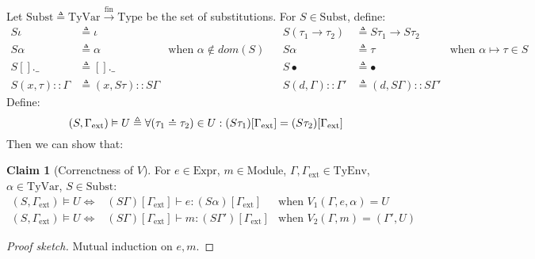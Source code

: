 \documentclass{article}
\theoremstyle{definition}
\newtheorem{clm}{Claim}[section]
\newcommand*{\cons}{::}
\newcommand*{\A}[1]{\overset{\,_{\mbox{\Large .}}}{#1}}
\newcommand*{\Expr}{\text{Expr}}
\newcommand*{\Module}{\text{Module}}
\newcommand*{\modid}{d}
\newcommand*{\fin}[2]{{#1}\xrightarrow{\text{fin}}{#2}}
\newcommand*{\TyEnv}{\text{TyEnv}}
\newcommand*{\TyVar}{\text{TyVar}}
\newcommand*{\Type}{\text{Type}}
\newcommand*{\Subst}{\text{Subst}}
\newcommand*{\external}{\Gamma_{\text{ext}}}
\begin{document}
Let $\Subst\triangleq\fin{\TyVar}{\Type}$ be the set of substitutions.
For $S\in\Subst$, define:
\begin{align*}
	S\iota               & \triangleq\iota                  &                                  &  & S(\tau_1\rightarrow\tau_2)   & \triangleq S\tau_1\rightarrow S\tau_2                                         \\
	S\alpha              & \triangleq\alpha                 & \text{when }\alpha\not\in dom(S) &  & S\alpha                      & \triangleq \tau                          & \text{when }\alpha\mapsto\tau\in S \\
	S[].\_               & \triangleq [].\_                 &                                  &  & S\bullet                     & \triangleq\bullet                                                             \\
	S(x,\tau)\cons\Gamma & \triangleq(x,S\tau)\cons S\Gamma &                                  &  & S(\modid,\Gamma)\cons\Gamma' & \triangleq(\modid,S\Gamma)\cons S\Gamma'
\end{align*}
Define:
\[(S,\external)\vDash U\triangleq\forall(\tau_1\A{=}\tau_2)\in U:(S\tau_1)[\external]= (S\tau_2)[\external]\]
Then we can show that:
\begin{clm}[Correnctness of $V$]
	For $e\in\Expr$, $m\in\Module$, $\Gamma,\external\in\TyEnv$, $\alpha\in\TyVar$, $S\in\Subst$:
	\begin{align*}
		(S,\external)\vDash U \Leftrightarrow & (S\Gamma)[\external]\vdash e:(S\alpha)[\external]  & \text{when }V_1(\Gamma,e,\alpha)=U    \\
		(S,\external)\vDash U \Leftrightarrow & (S\Gamma)[\external]\vdash m:(S\Gamma')[\external] & \text{when }V_2(\Gamma,m)=(\Gamma',U)
	\end{align*}
\end{clm}
\begin{proof}[Proof sketch]
	Mutual induction on $e,m$.
\end{proof}
\end{document}
